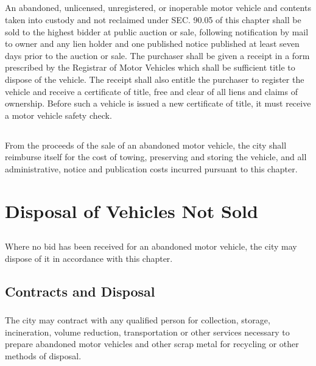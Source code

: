 \subsection{}
An abandoned, unlicensed, unregistered, or inoperable motor vehicle and contents taken into custody and not reclaimed under SEC. 90.05 of this chapter shall be sold to the highest bidder at public auction or sale, following notification by mail to owner and any lien holder and one published notice published at least seven days prior to the auction or sale. The purchaser shall be given a receipt in a form prescribed by the Registrar of Motor Vehicles which shall be sufficient title to dispose of the vehicle. The receipt shall also entitle the purchaser to register the vehicle and receive a certificate of title, free and clear of all liens and claims of ownership.  Before such a vehicle is issued a new certificate of title, it must receive a motor vehicle safety check.
\subsection{}
From the proceeds of the sale of an abandoned motor vehicle, the city shall reimburse itself for the cost of towing, preserving and storing the vehicle, and all administrative, notice and publication costs incurred pursuant to this chapter.

\section{Disposal of Vehicles Not Sold}
\subsection{}
Where no bid has been received for an abandoned motor vehicle, the city may dispose of it in accordance with this chapter.
\subsection{Contracts and Disposal}
\subsubsection{}
The city may contract with any qualified person for collection, storage, incineration, volume reduction, transportation or other services necessary to prepare abandoned motor vehicles and other scrap metal for recycling or other methods of disposal.
